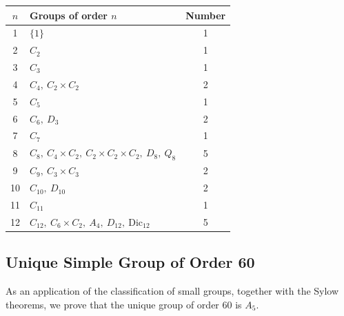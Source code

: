 \documentclass[a4paper]{article}
\begin{document}
\begin{center}
\begin{tabular}{c l c}
\hline
$n$ & Groups of order $n$ & Number \\
\hline
1 & $\{1\}$ & 1 \\
2 & $C_2$ & 1 \\
3 & $C_3$ & 1 \\
4 & $C_4,\ C_2 \times C_2$ & 2 \\
5 & $C_5$ & 1 \\
6 & $C_6,\ D_3$ & 2 \\
7 & $C_7$ & 1 \\
8 & $C_8,\ C_4\times C_2,\ C_2\times C_2\times C_2,\ D_8,\ Q_8$ & 5\\
9 & $C_9,\ C_3\times C_3$ & 2\\
10 & $C_{10},\ D_{10}$ & 2\\
11 & $C_{11}$ & 1\\
12 & $C_{12},\ C_6\times C_2,\ A_4,\ D_{12},\ \text{Dic}_{12}$ & 5\\
\hline
\end{tabular}
\end{center}

\subsection{Unique Simple Group of Order 60}
As an application of the classification of small groups, together with the Sylow theorems, we prove that the unique group of order $60$ is $A_5$. 
\end{document}
